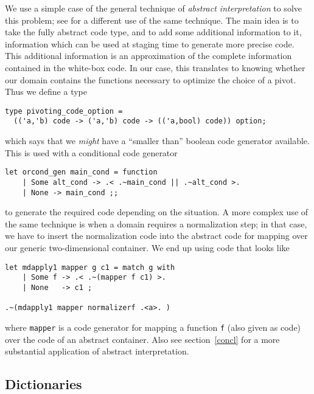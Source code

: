 \documentclass[11pt]{elsart}
\begin{document}
We use a simple case of the general technique of \emph{abstract interpretation} 
\cite{conf/popl/CousotC77} to solve this problem; see \cite{KiselyovTaha} for a
different use of the same technique.  The main idea is to take the fully
abstract code type, and to add some additional information to it, 
information which can be used at staging time to generate more precise
code.  This additional information is an approximation of the complete
information contained in the white-box code.
In our case, this translates to knowing whether our domain contains
the functions necessary to optimize the choice of a pivot.  Thus we 
define a type
\begin{small}
\begin{verbatim}
type pivoting_code_option =
  (('a,'b) code -> ('a,'b) code -> (('a,bool) code)) option;
\end{verbatim}
\end{small}
\noindent which says that we \textit{might} have a ``smaller than'' 
boolean code generator available.  This is used with a conditional
code generator
\begin{small}
\begin{verbatim}
let orcond_gen main_cond = function
    | Some alt_cond -> .< .~main_cond || .~alt_cond >.
    | None -> main_cond ;;
\end{verbatim}
\end{small}
\noindent to generate the required code depending on the situation.
A more complex use of the same technique is when a domain requires a 
normalization step; in that case, we have to insert the normalization
code into the abstract code for mapping over our generic two-dimensional
container.  We end up using code that looks like
\begin{small}
\begin{verbatim}
let mdapply1 mapper g c1 = match g with
    | Some f -> .< .~(mapper f c1) >.
    | None   -> c1 ;

.~(mdapply1 mapper normalizerf .<a>. )
\end{verbatim}
\end{small}
where \texttt{mapper} is a code generator for mapping a function \texttt{f}
(also given as code) over the code of an abstract container.  Also 
see section~\ref{concl} for a more substantial application of abstract
interpretation.

\subsection{Dictionaries}\label{dict}
\end{document}
